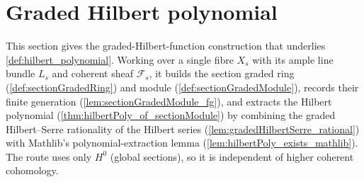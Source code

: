 \section{Graded Hilbert polynomial}
\label{sec:graded_hilbert_polynomial}

This section gives the graded-Hilbert-function construction that underlies
\cref{def:hilbert_polynomial}. Working over a single fibre \(X_s\) with its
ample line bundle \(L_s\) and coherent sheaf \(\mathcal{F}_s\), it builds the
section graded ring (\cref{def:sectionGradedRing}) and module
(\cref{def:sectionGradedModule}), records their finite generation
(\cref{lem:sectionGradedModule_fg}), and extracts the Hilbert polynomial
(\cref{thm:hilbertPoly_of_sectionModule}) by combining the graded
Hilbert--Serre rationality of the Hilbert series
(\cref{lem:gradedHilbertSerre_rational}) with Mathlib's polynomial-extraction
lemma (\cref{lem:hilbertPoly_exists_mathlib}). The route uses only \(H^0\)
(global sections), so it is independent of higher coherent cohomology.

